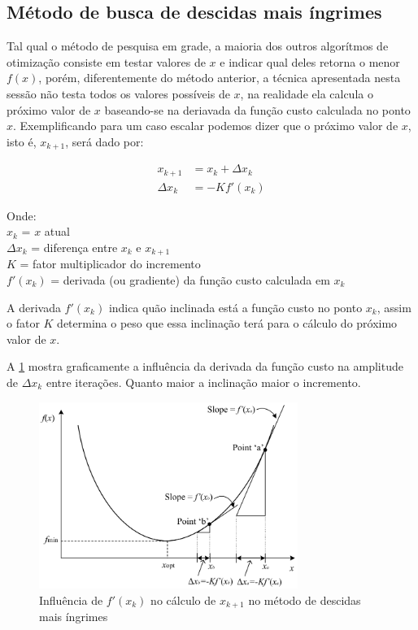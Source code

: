 \subsection{Método de busca de descidas mais íngrimes}

Tal qual o método de pesquisa em grade, a maioria dos outros algorítmos de otimização
consiste em testar valores de $x$ e indicar qual deles retorna o menor $f(x)$,
porém, diferentemente do método anterior, a técnica apresentada nesta sessão não testa
todos os valores possíveis de $x$, na realidade ela calcula o próximo valor de $x$ baseando-se
na deriavada da função custo calculada no ponto $x$. Exemplificando para um caso escalar
podemos dizer que o próximo valor de $x$, isto é, $x_{k+1}$, será dado por:

\begin{align}
	\label{eq:steepest_decent_xk1}
	x_{k+1} &= x_k + \Delta x_k \\ 
	\Delta x_k &= -K f'(x_k)
\end{align}

\noindent
Onde: \\
$x_k$ = $x$ atual \\
$\Delta x_k$ = diferença entre $x_k$ e $x_{k+1}$ \\
$K$ = fator multiplicador do incremento \\
$f'(x_k)$ = derivada (ou gradiente) da função custo calculada em $x_k$ \newline

A derivada $f'(x_k)$ indica quão inclinada está a função custo no ponto $x_k$,
assim o fator $K$ determina o peso que essa inclinação terá para o cálculo do
próximo valor de $x$.

A \cref{fig:steepest_decent_slope} mostra graficamente a influência da derivada
da função custo na amplitude de $\Delta x_k$ entre iterações. Quanto maior a inclinação
maior o incremento.

\begin{figure}
	\begin{center}
		\includegraphics[width=0.75\textwidth]{./5_images/fig_steepest_decent_slope.png} 
		\caption{Influência de $f'(x_k)$ no cálculo de $x_{k+1}$ no método de descidas mais íngrimes}
		\label{fig:steepest_decent_slope}
	\end{center}
\end{figure}



